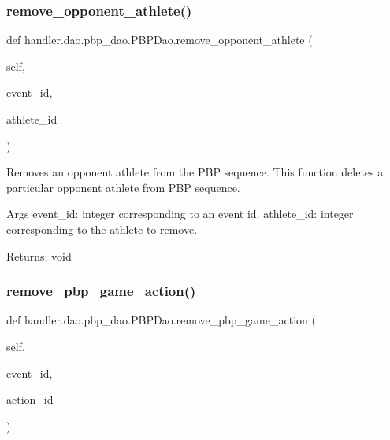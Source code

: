 \subsubsection{\texorpdfstring{remove\+\_\+opponent\+\_\+athlete()}{remove\_opponent\_athlete()}}
{\footnotesize\ttfamily def handler.\+dao.\+pbp\+\_\+dao.\+P\+B\+P\+Dao.\+remove\+\_\+opponent\+\_\+athlete (\begin{DoxyParamCaption}\item[{}]{self,  }\item[{}]{event\+\_\+id,  }\item[{}]{athlete\+\_\+id }\end{DoxyParamCaption})}

\begin{DoxyVerb}Removes an opponent athlete from the PBP sequence.
This function deletes a particular opponent athlete from PBP sequence.

Args
    event_id: integer corresponding to an event id.
    athlete_id: integer corresponding to the athlete to remove.

Returns:
    void
\end{DoxyVerb}
 \mbox{\label{classhandler_1_1dao_1_1pbp__dao_1_1_p_b_p_dao_acfab7336b3367e17ca6a987434f095cf}} 
\subsubsection{\texorpdfstring{remove\+\_\+pbp\+\_\+game\+\_\+action()}{remove\_pbp\_game\_action()}}
{\footnotesize\ttfamily def handler.\+dao.\+pbp\+\_\+dao.\+P\+B\+P\+Dao.\+remove\+\_\+pbp\+\_\+game\+\_\+action (\begin{DoxyParamCaption}\item[{}]{self,  }\item[{}]{event\+\_\+id,  }\item[{}]{action\+\_\+id }\end{DoxyParamCaption})}

